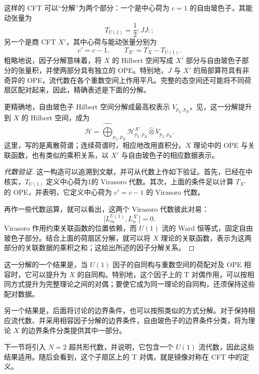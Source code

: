 这样的 CFT 可以“分解”为两个部分：一个是中心荷为 $c=1$ 的自由玻色子，其能动张量为
\[
T_{U(1)}=\frac12:JJ:;
\]
另一个是商 CFT $X'$，其中心荷与能动张量分别为
\[
c'=c-1,\qquad T_{X'}=T_X-T_{U(1)}.
\]
粗略地说，因子分解意味着，将 $X$ 的 Hilbert 空间写成 $X'$ 部分与自由玻色子部分的张量积，并使两部分具有独立的 OPE。特别地，$J$ 与 $X'$ 的局部算符具有非奇异的 OPE，流代数在各个重数空间上作用平凡。完整的态空间还可能将不同荷扇区配对起来，因此，精确表述是下面的分解。

更精确地，自由玻色子 Hilbert 空间分解成最高权表示 $V_{p_L,p_R}$，见，这一分解提升到 $X$ 的 Hilbert 空间，成为
\begin{equation}\label{eq:3.70}
\mathcal{H}=\widehat{\bigoplus}_{p_L,p_R}
\mathcal{H}^{X'}_{p_L,p_R}\widehat\otimes V_{p_L,p_R}.
\end{equation}
这里，写的是离散荷谱；连续荷谱时，相应地改用直积分。$X$ 理论中的 OPE 与关联函数，也有类似的乘积关系，以 $X'$ 与自由玻色子的相应数据表示。

\begin{proof}[代数验证]
这一构造可以追溯到文献，并可从代数上作如下验证。首先，已经在中核实，$T_{U(1)}$ 定义中心荷为1的 Virasoro 代数。其次，上面的条件足以计算 $T_{X'}$ 的 OPE，并表明，它定义中心荷为 $c'=c-1$ 的 Virasoro 代数。

再作一些代数运算，就可以看出，这两个 Virasoro 代数彼此对易：
\[
\bigl[L_m^{U(1)},L_n^{X'}\bigr]=0.
\]
Virasoro 作用约束关联函数的位置依赖，而 $U(1)$ 流的 Ward 恒等式，固定自由玻色子部分。结合上面的荷扇区分解，就可以将 $X$ 理论的关联函数，表示为这两部分的关联数据的乘积之和；这给出所述的因子分解关系。
\end{proof}

这一分解的一个结果是，当 $U(1)$ 因子的自同构与重数空间的荷配对及 OPE 相容时，它可以提升为 $X$ 的自同构。特别地，这个因子上的 T 对偶作用，可以按相同方式提升为完整理论之间的对偶；要使它成为同一理论的自同构，还须保持这些配对数据。

另一个结果是，后面将讨论的边界条件，也可以按照类似的方式分解。对于保持相应流代数、并采用相容因子分解的边界条件，自由玻色子的边界条件分类，将为理论 $X$ 的边界条件分类提供其中一部分。

下一节将引入 $N=2$ 超共形代数，并说明，它包含一个 $U(1)$ 流代数，因此这些结果适用。随后会看到，这个子扇区上的 T 对偶，就是镜像对称在 CFT 中的定义。

